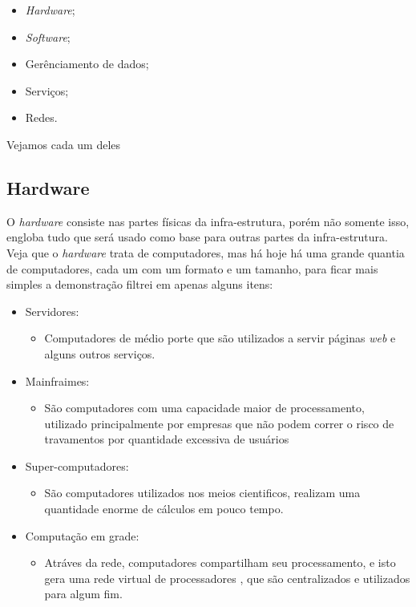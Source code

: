 \documentclass[
	12pt,				%
	openany,			%
	a4paper,			%
	chapter=TITLE,		%
	section=TITLE,		%
	english,
	brazil				%
]{abntex2}
\begin{document}
\begin{itemize}
\begin{itemize}
\begin{itemize}
	\begin{itemize}
		\item[] \textit{Hardware};
		\item[] \textit{Software};
		\item[] Gerênciamento de dados;
		\item[] Serviços;
		\item[] Redes.
	\end{itemize}

	Vejamos cada um deles

	\subsection{Hardware}
	O \textit{hardware} consiste nas partes físicas da infra-estrutura, porém não somente isso, engloba tudo que será usado como base para outras partes da infra-estrutura. Veja que o \textit{hardware} trata de computadores, mas há hoje há uma grande quantia de computadores, cada um com um formato e um tamanho, para ficar mais simples a demonstração filtrei em apenas alguns itens:
	\begin{itemize}
		\item Servidores:
			\begin{itemize}
				\item[] Computadores de médio porte que são utilizados a servir páginas \textit{web} e alguns outros serviços.
			\end{itemize}
		\item Mainfraimes:
			\begin{itemize}
				\item[] São computadores com uma capacidade maior de processamento, utilizado principalmente por empresas que não podem correr o risco de travamentos por quantidade excessiva de usuários
			\end{itemize}
		\item Super-computadores:
			\begin{itemize}
				\item[] São computadores utilizados nos meios cientificos, realizam uma quantidade enorme de cálculos em pouco tempo.
			\end{itemize}
		\item Computação em grade:
			\begin{itemize}
				\item Atráves da rede, computadores compartilham seu processamento, e isto gera uma rede virtual de processadores , que são centralizados e utilizados para algum fim.
			\end{itemize}
	\end{itemize}


\end{itemize}
\end{itemize}
\end{itemize}
\end{document}
